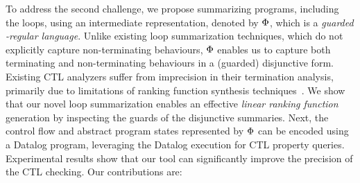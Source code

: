 To address the second challenge, we propose summarizing programs, including the loops, using an intermediate representation, denoted by ${\mathrm{\Phi}}$, which is a \emph{guarded \code{\omega}-regular language}. 
Unlike existing loop summarization techniques, which do not explicitly capture non-terminating behaviours, ${\mathrm{\Phi}}$ enables us to 
capture both terminating and non-terminating behaviours in a (guarded) disjunctive form.  
Existing CTL analyzers suffer from imprecision in their termination analysis, primarily due to limitations of ranking function synthesis techniques~\cite{DBLP:conf/fmcad/CookKP14, DBLP:conf/sas/UrbanU018}. 
We show that our novel loop summarization enables an effective \emph{linear ranking function} \cite{DBLP:conf/sas/Ben-AmramDG19} generation by inspecting the guards of the disjunctive summaries. 
Next, the control flow and abstract program states represented by ${\mathrm{\Phi}}$ can be encoded using a Datalog program, leveraging the Datalog execution for CTL property queries. 
Experimental results show that our tool \toolName can significantly improve the precision of the CTL checking. 
Our contributions are: 




